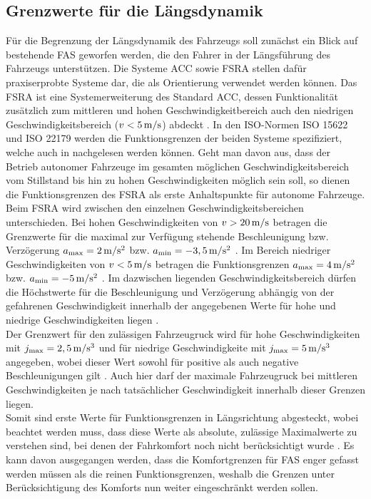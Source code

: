 \subsection{Grenzwerte für die Längsdynamik} \label{subsec:längsdynamik}
Für die Begrenzung der Längsdynamik des Fahrzeugs soll zunächst ein Blick auf bestehende \gls{FAS} geworfen werden, die den Fahrer in der Längsführung des Fahrzeugs unterstützen. Die Systeme \gls{ACC} sowie \gls{FSRA} stellen dafür praxiserprobte Systeme dar, die als Orientierung verwendet werden können. Das \gls{FSRA} ist eine Systemerweiterung des Standard \gls{ACC}, dessen Funktionalität zusätzlich zum mittleren und hohen Geschwindigkeitbereich auch den niedrigen Geschwindigkeitsbereich ($v < 5\,\mathrm{m/s}$) abdeckt \cite{Winner handbuch FAS acc}. In den ISO-Normen ISO 15622 \cite{iso15622} und ISO 22179 \cite{iso22179} werden die Funktionsgrenzen der beiden Systeme spezifiziert, welche auch in \cite{Winner handbuch FAS acc} nachgelesen werden können. Geht man davon aus, dass der Betrieb autonomer Fahrzeuge im gesamten möglichen Geschwindigkeitsbereich vom Stillstand bis hin zu hohen Geschwindigkeiten möglich sein soll, so dienen die Funktionsgrenzen des \gls{FSRA} als erste Anhaltspunkte für autonome Fahrzeuge. \\
Beim \gls{FSRA} wird zwischen den einzelnen Geschwindigkeitsbereichen unterschieden. Bei hohen Geschwindigkeiten von $v>20\,\mathrm{m/s}$ betragen die Grenzwerte für die maximal zur Verfügung stehende Beschleunigung bzw. Verzögerung $a_{\textrm{max}} = 2\,\mathrm{m/s^2}$ bzw. $a_{\textrm{min}} = -3,5\,\mathrm{m/s^2}$ \cite{Winner handbuch FAS acc}. Im Bereich niedriger Geschwindigkeiten von $v < 5\,\mathrm{m/s}$ betragen die Funktionsgrenzen $a_{\textrm{max}} = 4\,\mathrm{m/s^2}$ bzw. $a_{\textrm{min}} = -5\,\mathrm{m/s^2}$ \cite{Winner handbuch FAS acc}. Im dazwischen liegenden Geschwindigkeitsbereich dürfen die Höchstwerte für die Beschleunigung und Verzögerung abhängig von der gefahrenen Geschwindigkeit innerhalb der angegebenen Werte für hohe und niedrige Geschwindigkeiten liegen \cite{Winner handbuch FAS acc}.\\
Der Grenzwert für den zulässigen Fahrzeugruck wird für hohe Geschwindigkeiten mit $j_{\textrm{max}} = 2,5\,\mathrm{m/s^3}$ und für niedrige Geschwindigkeite mit $j_{\textrm{max}} = 5\,\mathrm{m/s^3}$ angegeben, wobei dieser Wert sowohl für positive als auch negative Beschleunigungen gilt \cite{Winner handbuch FAS acc}. Auch hier darf der maximale Fahrzeugruck bei mittleren Geschwindigkeiten je nach tatsächlicher Geschwindigkeit innerhalb dieser Grenzen liegen. \\
Somit sind erste Werte für Funktionsgrenzen in Längsrichtung abgesteckt, wobei beachtet werden muss, dass diese Werte als absolute, zulässige Maximalwerte zu verstehen sind, bei denen der Fahrkomfort noch nicht berücksichtigt wurde \cite{Festner.2019}. Es kann davon ausgegangen werden, dass die Komfortgrenzen für \gls{FAS} enger gefasst werden müssen als die reinen Funktionsgrenzen, weshalb die Grenzen unter Berücksichtigung des Komforts nun weiter eingeschränkt werden sollen.

